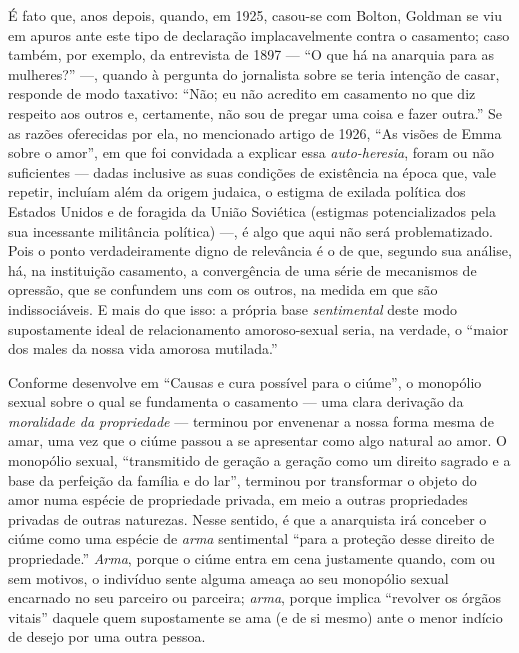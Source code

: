 É fato que, anos depois, quando, em 1925, casou-se com Bolton, Goldman
se viu em apuros ante este tipo de declaração implacavelmente contra o
casamento; caso também, por exemplo, da entrevista de 1897 --- ``O que há
na anarquia para as mulheres?'' ---, quando à pergunta do jornalista sobre
se teria intenção de casar, responde de modo taxativo: ``Não; eu não
acredito em casamento no que diz respeito aos outros e, certamente, não
sou de pregar uma coisa e fazer outra.'' Se as razões oferecidas por
ela, no mencionado artigo de 1926, ``As visões de Emma sobre o amor'',
em que foi convidada a explicar essa \textit{auto-heresia}, foram ou não
suficientes --- dadas inclusive as suas condições de existência na época
que, vale repetir, incluíam além da origem judaica, o estigma de exilada
política dos Estados Unidos e de foragida da União Soviética
(estigmas potencializados pela sua incessante militância política) ---, é
algo que aqui não será problematizado. Pois o ponto verdadeiramente
digno de relevância é o de que, segundo sua análise, há, na instituição
casamento, a convergência de uma série de mecanismos de opressão, que se
confundem uns com os outros, na medida em que são indissociáveis. E mais
do que isso: a própria base \textit{sentimental} deste modo supostamente
ideal de relacionamento amoroso-sexual seria, na verdade, o ``maior dos
males da nossa vida amorosa mutilada.''

Conforme desenvolve em ``Causas e cura possível para o ciúme'', o
monopólio sexual sobre o qual se fundamenta o casamento --- uma clara
derivação da \textit{moralidade da propriedade} --- terminou por envenenar a
nossa forma mesma de amar, uma vez que o ciúme passou a se apresentar
como algo natural ao amor. O monopólio sexual, ``transmitido de
geração a geração como um direito sagrado e a base da perfeição da
família e do lar'', terminou por transformar o objeto do amor numa
espécie de propriedade privada, em meio a outras propriedades privadas
de outras naturezas. Nesse sentido, é que a anarquista irá conceber o
ciúme como uma espécie de \textit{arma} sentimental ``para a proteção desse
direito de propriedade.'' \textit{Arma}, porque o ciúme entra em cena
justamente quando, com ou sem motivos, o indivíduo sente alguma ameaça
ao seu monopólio sexual encarnado no seu parceiro ou parceira; \textit{arma},
porque implica ``revolver os órgãos vitais'' daquele quem supostamente
se ama (e de si mesmo) ante o menor indício de desejo por uma outra
pessoa. 

